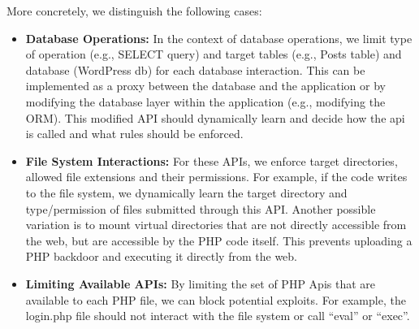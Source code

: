 More concretely, we distinguish the following cases:
\begin{itemize}
  \item \textbf{Database Operations:} In the context of database operations, we limit type of operation (e.g., SELECT query) and target tables (e.g., Posts table) and database (WordPress db) for each database interaction. This can be implemented as a proxy between the database and the application or by modifying the database layer within the application (e.g., modifying the ORM). This modified API should dynamically learn and decide how the api is called and what rules should be enforced.
  \item \textbf{File System Interactions:} For these APIs, we enforce target directories, allowed file extensions and their permissions. For example, if the code writes to the file system, we dynamically learn the target directory and type/permission of files submitted through this API.
  Another possible variation is to mount virtual directories that are not directly accessible from the web, but are accessible by the PHP code itself. This prevents uploading a PHP backdoor and executing it directly from the web.
  \item \textbf{Limiting Available APIs:} By limiting the set of PHP Apis that are available to each PHP file, we can block potential exploits. For example, the login.php file should not interact with the file system or call ``eval'' or ``exec''.
\end{itemize}
